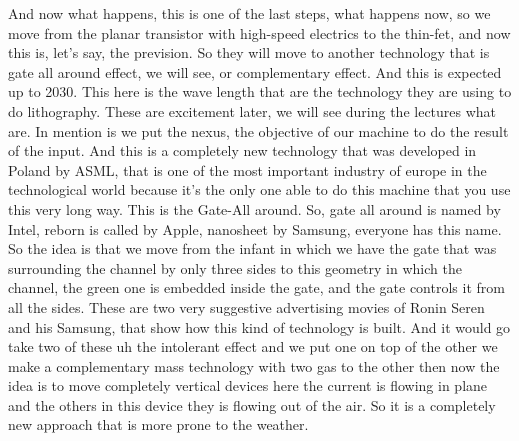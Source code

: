 And now what happens, this is one of the last steps, what happens now, so we move from the planar transistor with high-speed electrics to the thin-fet, and now this is, let's say, the prevision. So they will move to another technology that is gate all around effect, we will see, or complementary effect. And this is expected up to 2030. This here is the wave length that are the technology they are using to do lithography. These are excitement later, we will see during the lectures what are. In mention is we put the nexus, the objective of our machine to do the result of the input. And this is a completely new technology that was developed in Poland by ASML, that is one of the most important industry of europe in the technological world because it's the only one able to do this machine that you use this very long way.
This is the Gate-All around. So, gate all around is named by Intel, reborn is called by Apple, nanosheet by Samsung, everyone has this name. So the idea is that we move from the infant in which we have the gate that was surrounding the channel by only three sides to this geometry in which the channel, the green one is embedded inside the gate, and the gate controls it from all the sides. These are two very suggestive advertising movies of Ronin Seren and his Samsung, that show how this kind of technology is built.
And it would go take two of these uh the intolerant effect and we put one on top of the other we make a complementary mass technology with two gas to the other then now the idea is to move completely vertical devices here the current is flowing in plane and the others in this device they is flowing out of the air. So it is a completely new approach that is more prone to the weather.











